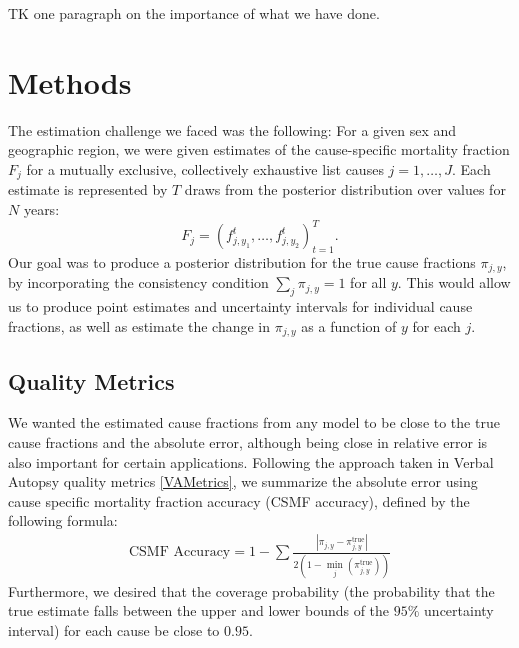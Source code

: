   TK one paragraph on the importance of what we have done.


\section*{Methods}
The estimation challenge we faced was the following: For a given sex
and geographic region, we were given estimates of the cause-specific
mortality fraction $F_j$ for a mutually exclusive, collectively
exhaustive list causes $j = 1,\ldots,J$.  Each estimate is
represented by $T$ draws from the posterior distribution over values
for $N$ years:
\[F_j = \left(f_{j,y_1}^t, \ldots, f_{j,y_2}^t\right)_{t=1}^T.
\]
Our goal was to produce a posterior distribution for the true cause
fractions $\pi_{j,y}$, by incorporating the consistency condition
$\sum_{j} \pi_{j,y}=1$ for all $y$.  This would allow us to produce
point estimates and uncertainty intervals for individual cause
fractions, as well as estimate the change in $\pi_{j,y}$ as a function
of $y$ for each $j$.

  \subsection*{Quality Metrics}
  We wanted the estimated cause fractions from any model to be close
  to the true cause fractions and the absolute error, although being
  close in relative error is also important for certain applications.
  Following the approach taken in Verbal Autopsy quality metrics
  \ref{VAMetrics}, we summarize the absolute error using cause
  specific mortality fraction accuracy (CSMF accuracy), defined by the
  following formula:
  \begin{align*}
    \text{CSMF Accuracy} = 1- \sum \frac{\left | \pi_{j,y} - \pi^{\text{true}}_{j,y} \right |}{2(1-\min_j(\pi^{\text{true}}_{j,y}))}
  \end{align*}
  Furthermore, we desired that the coverage probability (the
  probability that the true estimate falls between the upper and lower
  bounds of the $95\%$ uncertainty interval) for each cause be close
  to $0.95$.

